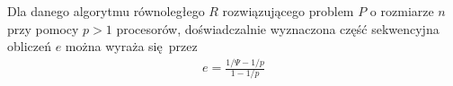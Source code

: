 \begin{definicja}
Dla danego algorytmu równoległego \(R\) rozwiązującego problem \(P\) o rozmiarze \(n\) przy pomocy \(p>1\) procesorów, doświadczalnie wyznaczona część sekwencyjna obliczeń \(e\) można wyraża się przez
\begin{align}
e = \frac{1/\Psi - 1/p}{1 - 1/p}
\end{align}
\end{definicja}